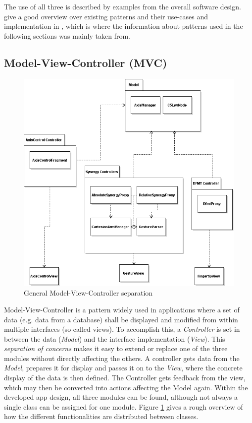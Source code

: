 The use of all three is described by examples from the overall software design. \citeauthor{Eilebrecht2013} give a good overview over existing patterns and their use-cases and implementation in \cite{Eilebrecht2013}, which is where the information about patterns used in the following sections was mainly taken from.

\subsection{Model-View-Controller (MVC)}

\begin{figure}
	\caption{\label{fig:conc:mvc}General Model-View-Controller separation}
	\includegraphics[width=\linewidth]{assets/chpt_concepts/sw/mvc.png}
\end{figure}

Model-View-Controller is a pattern widely used in applications where a set of data (e.g. data from a database) shall be displayed and modified from within multiple interfaces (so-called views)\cite{Eilebrecht2013}. To accomplish this, a \textit{Controller} is set in between the data (\textit{Model}) and the interface implementation (\textit{View}). This \textit{separation of concerns} makes it easy to extend or replace one of the three modules without directly affecting the others. A controller gets data from the \textit{Model}, prepares it for display and passes it on to the \textit{View}, where the concrete display of the data is then defined. The Controller gets feedback from the view, which may then be converted into actions affecting the Model again. Within the developed app design, all three modules can be found, although not always a single class can be assigned for one module. Figure \ref{fig:conc:mvc} gives a rough overview of how the different functionalities are distributed between classes.

